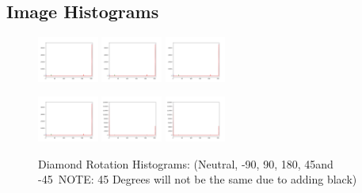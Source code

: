 \documentclass[conference]{IEEEtran}
\begin{document}
\subsection{Image Histograms}
\begin{figure}[H]
    \centerline{
        {\includegraphics[width=20mm, scale=0.5]{./figures/RotationHists/diamondneutral Hist.png}}
        {\includegraphics[width=20mm, scale=0.5]{./figures/RotationHists/diamonddeg90 Hist.png}}
        {\includegraphics[width=20mm, scale=0.5]{./figures/RotationHists/diamonddegn90 Hist.png}}
    }
    \centerline{
        {\includegraphics[width=20mm, scale=0.5]{./figures/RotationHists/diamondflipped Hist.png}}
        {\includegraphics[width=20mm, scale=0.5]{./figures/RotationHists/diamonddeg45 Hist.png}}
        {\includegraphics[width=20mm, scale=0.5]{./figures/RotationHists/diamonddegn45 Hist.png}}
    }
    \caption{Diamond Rotation Histograms: (Neutral, -90\degree, 90\degree, 180\degree, 45\degree and -45\degree\ NOTE: 45 Degrees will not be the same due to adding black)}
    \label{fig}
\end{figure}
\end{document}
